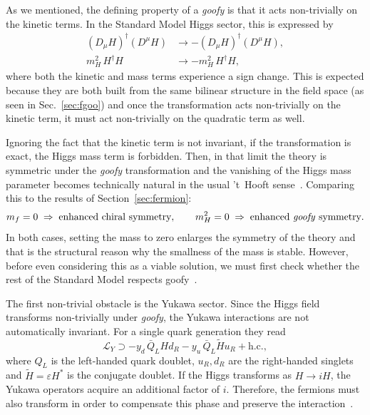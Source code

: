 \documentclass[a4paper, 11pt]{article}
\begin{document}
As we mentioned, the defining property of a \textit{goofy} is that it acts non-trivially on the kinetic terms. In the Standard Model Higgs sector, this is expressed by
\begin{equation}
    \begin{aligned}
    (D_\mu H)^\dagger (D^\mu H)
    &\rightarrow
    -(D_\mu H)^\dagger (D^\mu H),
    \\
    m_H^2\, H^\dagger H
    &\rightarrow
    -m_H^2\, H^\dagger H,
    \end{aligned}
    \label{eq:goofy_higgs_kinetic-mass}
\end{equation}
where both the kinetic and mass terms experience a sign change. This is expected because they are both built from the same bilinear structure in the field space (as seen in Sec.~\ref{sec:fgoo}) and once the transformation acts non-trivially on the kinetic term, it must act non-trivially on the quadratic term as well.

Ignoring the fact that the kinetic term is not invariant, if the transformation is exact, the Higgs mass term is forbidden. Then, in that limit the theory is symmetric under the \textit{goofy} transformation and the vanishing of the Higgs mass parameter becomes technically natural in the usual 't~Hooft sense~\cite{goofy2}. Comparing this to the results of Section~\ref{sec:fermion}:
\begin{equation*}
m_f = 0 \;\Rightarrow\; \text{enhanced chiral symmetry},
\qquad
m_H^2 = 0 \;\Rightarrow\; \text{enhanced \textit{goofy} symmetry}.
\end{equation*}
In both cases, setting the mass to zero enlarges the symmetry of the theory and that is the structural reason why the smallness of the mass is stable. However, before even considering this as a viable solution, we must first check whether the rest of the Standard Model respects goofy~\cite{Trautner_goofy1, goofy2}.

The first non-trivial obstacle is the Yukawa sector. Since the Higgs field transforms non-trivially under \textit{goofy}, the Yukawa interactions are not automatically invariant. For a single quark generation they read
\begin{equation*}
\mathcal{L}_{Y}
\supset
-y_d\,\bar Q_L H d_R
-y_u\,\bar Q_L \widetilde H u_R
+\text{h.c.},
\end{equation*}
where $Q_L$ is the left-handed quark doublet, $u_R,d_R$ are the right-handed singlets and $\widetilde{H}=\varepsilon H^*$ is the conjugate doublet. If the Higgs transforms as $H\rightarrow iH$, the Yukawa operators acquire an additional factor of $i$. Therefore, the fermions must also transform in order to compensate this phase and preserve the interaction~\cite{goofy2,Trautner_goofy1}.
\end{document}
